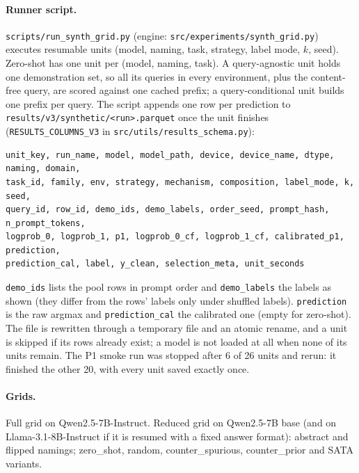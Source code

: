 \documentclass[11pt,a4paper]{article}
\newcommand{\1}{\mathbf{1}}
\theoremstyle{plain}
\theoremstyle{definition}
\theoremstyle{remark}
\begin{document}
\paragraph{Runner script.} \texttt{scripts/run\_synth\_grid.py} (engine:
\texttt{src/experiments/synth\_grid.py}) executes resumable units (model,
naming, task, strategy, label mode, $k$, seed). Zero-shot has one unit per
(model, naming, task). A query-agnostic unit holds one demonstration set, so
all its queries in every environment, plus the content-free query, are
scored against one cached prefix; a query-conditional unit builds one prefix
per query. The script appends one row per prediction to
\texttt{results/v3/synthetic/<run>.parquet} once the unit finishes
(\texttt{RESULTS\_COLUMNS\_V3} in \texttt{src/utils/results\_schema.py}):
\begin{lstlisting}
unit_key, run_name, model, model_path, device, device_name, dtype, naming, domain,
task_id, family, env, strategy, mechanism, composition, label_mode, k, seed,
query_id, row_id, demo_ids, demo_labels, order_seed, prompt_hash, n_prompt_tokens,
logprob_0, logprob_1, p1, logprob_0_cf, logprob_1_cf, calibrated_p1, prediction,
prediction_cal, label, y_clean, selection_meta, unit_seconds
\end{lstlisting}
\texttt{demo\_ids} lists the pool rows in prompt order and
\texttt{demo\_labels} the labels as shown (they differ from the rows' labels
only under shuffled labels). \texttt{prediction} is the raw argmax and
\texttt{prediction\_cal} the calibrated one (empty for zero-shot). The file
is rewritten through a temporary file and an atomic rename, and a unit is
skipped if its rows already exist; a model is not loaded at all when none of
its units remain. The P1 smoke run was stopped after 6 of 26 units and
rerun: it finished the other 20, with every unit saved exactly once.

\paragraph{Grids.} Full grid on Qwen2.5-7B-Instruct. Reduced grid on
Qwen2.5-7B base (and on Llama-3.1-8B-Instruct if it is resumed with a fixed
answer format): abstract and flipped namings;
zero\_shot, random, counter\_spurious, counter\_prior and SATA variants.
\end{document}
